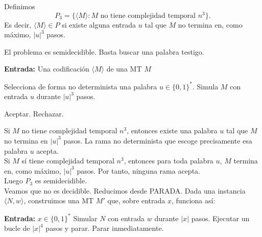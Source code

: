 \documentclass[12pt]{article}
\begin{document}
\begin{ejercicio}[2.4 puntos]
\begin{enumerate}
            Definimos
            $$
            P_3=\{\langle M\rangle : M \text{ no tiene complejidad temporal } n^3\}.
            $$
            Es decir, $\langle M\rangle\in P$ si existe alguna entrada $u$ tal que $M$ no termina en, como máximo, $|u|^3$ pasos.

            El problema es semidecidible. Basta buscar una palabra testigo.

            \begin{algorithm}
            \caption{MTND semidecisora de $P$}
            \begin{algorithmic}
            \State \textbf{Entrada:} Una codificación $\langle M\rangle$ de una MT $M$

            \State Selecciona de forma no determinista una palabra $u\in\{0,1\}^*$.
            \State Simula $M$ con entrada $u$ durante $|u|^3$ pasos.

                \State Aceptar.
            \Else
                \State Rechazar.
            \EndIf
            \end{algorithmic}
            \end{algorithm}

            Si $M$ no tiene complejidad temporal $n^3$, entonces existe una palabra $u$ tal que $M$ no termina en $|u|^3$ pasos. La rama no determinista que escoge precisamente esa palabra $u$ acepta. \\

            Si $M$ sí tiene complejidad temporal $n^3$, entonces para toda palabra $u$, $M$ termina en, como máximo, $|u|^3$ pasos. Por tanto, ninguna rama acepta. \\

            Luego $P_3$ es semidecidible. \\

            Veamos que no es decidible. Reducimos desde PARADA. Dada una instancia $\langle N,w\rangle$, construimos una MT $M'$ que, sobre entrada $x$, funciona así:

            \begin{algorithm}
            \caption{MT $M'$}
            \begin{algorithmic}
            \State \textbf{Entrada:} $x\in\{0,1\}^*$
            \State Simular $N$ con entrada $w$ durante $|x|$ pasos.
                \State Ejecutar un bucle de $|x|^4$ pasos y parar.
            \Else
                \State Parar inmediatamente.
            \EndIf
            \end{algorithmic}
            \end{algorithm}


\end{enumerate}
\end{ejercicio}
\end{document}
